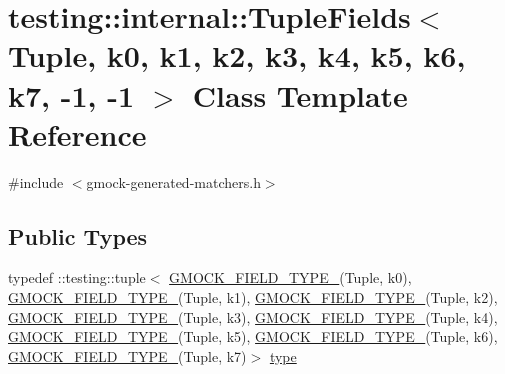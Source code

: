 \hypertarget{classtesting_1_1internal_1_1TupleFields_3_01Tuple_00_01k0_00_01k1_00_01k2_00_01k3_00_01k4_00_01kb66bdb5aa3faae197a495470a1b8e9d1}{}\section{testing\+::internal\+::Tuple\+Fields$<$ Tuple, k0, k1, k2, k3, k4, k5, k6, k7, -\/1, -\/1 $>$ Class Template Reference}
\label{classtesting_1_1internal_1_1TupleFields_3_01Tuple_00_01k0_00_01k1_00_01k2_00_01k3_00_01k4_00_01kb66bdb5aa3faae197a495470a1b8e9d1}


{\ttfamily \#include $<$gmock-\/generated-\/matchers.\+h$>$}

\subsection*{Public Types}
\begin{DoxyCompactItemize}
\item 
typedef \+::testing\+::tuple$<$ \mbox{\hyperlink{gmock-generated-matchers_8h_acf3e27de83a73f0d873da1cd471e505b}{G\+M\+O\+C\+K\+\_\+\+F\+I\+E\+L\+D\+\_\+\+T\+Y\+P\+E\+\_\+}}(Tuple, k0), \mbox{\hyperlink{gmock-generated-matchers_8h_acf3e27de83a73f0d873da1cd471e505b}{G\+M\+O\+C\+K\+\_\+\+F\+I\+E\+L\+D\+\_\+\+T\+Y\+P\+E\+\_\+}}(Tuple, k1), \mbox{\hyperlink{gmock-generated-matchers_8h_acf3e27de83a73f0d873da1cd471e505b}{G\+M\+O\+C\+K\+\_\+\+F\+I\+E\+L\+D\+\_\+\+T\+Y\+P\+E\+\_\+}}(Tuple, k2), \mbox{\hyperlink{gmock-generated-matchers_8h_acf3e27de83a73f0d873da1cd471e505b}{G\+M\+O\+C\+K\+\_\+\+F\+I\+E\+L\+D\+\_\+\+T\+Y\+P\+E\+\_\+}}(Tuple, k3), \mbox{\hyperlink{gmock-generated-matchers_8h_acf3e27de83a73f0d873da1cd471e505b}{G\+M\+O\+C\+K\+\_\+\+F\+I\+E\+L\+D\+\_\+\+T\+Y\+P\+E\+\_\+}}(Tuple, k4), \mbox{\hyperlink{gmock-generated-matchers_8h_acf3e27de83a73f0d873da1cd471e505b}{G\+M\+O\+C\+K\+\_\+\+F\+I\+E\+L\+D\+\_\+\+T\+Y\+P\+E\+\_\+}}(Tuple, k5), \mbox{\hyperlink{gmock-generated-matchers_8h_acf3e27de83a73f0d873da1cd471e505b}{G\+M\+O\+C\+K\+\_\+\+F\+I\+E\+L\+D\+\_\+\+T\+Y\+P\+E\+\_\+}}(Tuple, k6), \mbox{\hyperlink{gmock-generated-matchers_8h_acf3e27de83a73f0d873da1cd471e505b}{G\+M\+O\+C\+K\+\_\+\+F\+I\+E\+L\+D\+\_\+\+T\+Y\+P\+E\+\_\+}}(Tuple, k7)$>$ \mbox{\hyperlink{classtesting_1_1internal_1_1TupleFields_3_01Tuple_00_01k0_00_01k1_00_01k2_00_01k3_00_01k4_00_01kb66bdb5aa3faae197a495470a1b8e9d1_a4ca1e3e9805d5f38ac371529b67496d2}{type}}
\end{DoxyCompactItemize}
